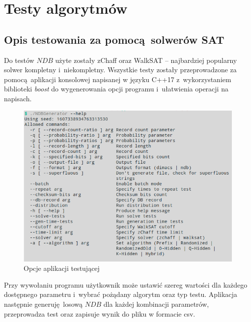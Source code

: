 \chapter{Testy algorytmów}
\label{chp:tests}
\section{Opis testowania za pomocą solwerów SAT}


Do testów $NDB$ użyte zostały zChaff oraz WalkSAT -- najbardziej popularny solwer kompletny i~niekompletny.
Wszystkie testy zostały przeprowadzone za pomocą aplikacji konsolowej napisanej w języku C++17 z~wykorzystaniem
biblioteki \textit{boost} do wygenerowania opcji programu i~ułatwienia operacji na napisach.

\begin{figure}[h]
    \includegraphics[width=15cm]{img/NDBGeneratorHelp.png}
    \centering
    \caption{Opcje aplikacji testującej}
    \label{img:NDBGenHelp}
\end{figure}

Przy wywołaniu programu użytkownik może ustawić szereg wartości dla każdego dostępnego parametru i~wybrać pożądany algorytm oraz typ testu.
Aplikacja następnie generuję losową $NDB$ dla każdej kombinacji parametrów, przeprowadza test oraz zapisuje wynik do pliku w formacie csv.

